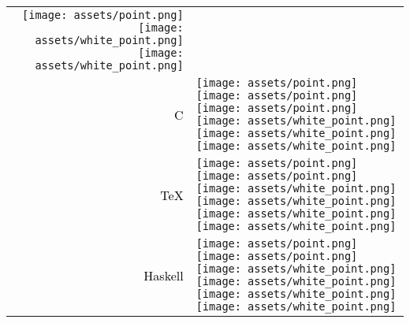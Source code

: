 \documentclass[../main.tex]{subfiles}
\begin{document}
\begin{tabular}{r l}
            \texttt{[image: assets/point.png]}
            \texttt{[image: assets/white\_point.png]}
            \texttt{[image: assets/white\_point.png]}\\
    \textcolor{black}{\vspace*{0.1cm}C} &
            \texttt{[image: assets/point.png]}
            \texttt{[image: assets/point.png]}
            \texttt{[image: assets/point.png]}
            \texttt{[image: assets/white\_point.png]}
            \texttt{[image: assets/white\_point.png]}
            \texttt{[image: assets/white\_point.png]}\\
    \textcolor{black}{\vspace*{0.1cm}TeX} &
            \texttt{[image: assets/point.png]}
            \texttt{[image: assets/point.png]}
            \texttt{[image: assets/white\_point.png]}
            \texttt{[image: assets/white\_point.png]}
            \texttt{[image: assets/white\_point.png]}
            \texttt{[image: assets/white\_point.png]}\\
    \textcolor{black}{\vspace*{0.1cm}Haskell} &
            \texttt{[image: assets/point.png]}
            \texttt{[image: assets/point.png]}
            \texttt{[image: assets/white\_point.png]}
            \texttt{[image: assets/white\_point.png]}
            \texttt{[image: assets/white\_point.png]}
            \texttt{[image: assets/white\_point.png]}\\
    
            
    \end{tabular}
\end{document}
